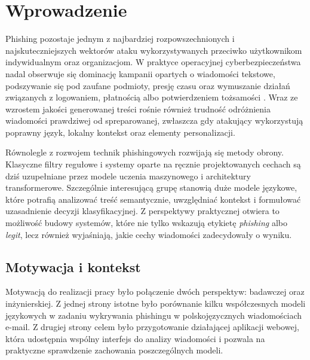 \documentclass[12pt,a4paper,openright]{report}
\begin{document}

\restoregeometry
\clearpage


\clearpage

\tableofcontents
\clearpage


\chapter{Wprowadzenie}

Phishing pozostaje jednym z najbardziej rozpowszechnionych i najskuteczniejszych wektorów ataku wykorzystywanych przeciwko użytkownikom indywidualnym oraz organizacjom. W praktyce operacyjnej cyberbezpieczeństwa nadal obserwuje się dominację kampanii opartych o wiadomości tekstowe, podszywanie się pod zaufane podmioty, presję czasu oraz wymuszanie działań związanych z logowaniem, płatnością albo potwierdzeniem tożsamości \cite{apwg2023,kaspersky2024}. Wraz ze wzrostem jakości generowanej treści rośnie również trudność odróżnienia wiadomości prawdziwej od spreparowanej, zwłaszcza gdy atakujący wykorzystują poprawny język, lokalny kontekst oraz elementy personalizacji.

Równolegle z rozwojem technik phishingowych rozwijają się metody obrony. Klasyczne filtry regułowe i systemy oparte na ręcznie projektowanych cechach są dziś uzupełniane przez modele uczenia maszynowego i architektury transformerowe. Szczególnie interesującą grupę stanowią duże modele językowe, które potrafią analizować treść semantycznie, uwzględniać kontekst i formułować uzasadnienie decyzji klasyfikacyjnej. Z perspektywy praktycznej otwiera to możliwość budowy systemów, które nie tylko wskazują etykietę \textit{phishing} albo \textit{legit}, lecz również wyjaśniają, jakie cechy wiadomości zadecydowały o wyniku.

\section{Motywacja i kontekst}

Motywacją do realizacji pracy było połączenie dwóch perspektyw: badawczej oraz inżynierskiej. Z jednej strony istotne było porównanie kilku współczesnych modeli językowych w zadaniu wykrywania phishingu w polskojęzycznych wiadomościach e-mail. Z drugiej strony celem było przygotowanie działającej aplikacji webowej, która udostępnia wspólny interfejs do analizy wiadomości i pozwala na praktyczne sprawdzenie zachowania poszczególnych modeli.
\end{document}
